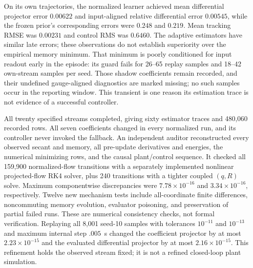 On its own trajectories, the normalized learner achieved mean differential
projector error $0.00622$ and input-aligned relative differential error
$0.00545$, while the frozen prior's corresponding errors were $0.248$ and
$0.219$. Mean tracking RMSE was $0.00231$ and control RMS was $0.6460$.
The adaptive estimators have similar late errors; these observations do not
establish superiority over the empirical memory minimum. That minimum is
poorly conditioned for input readout early in the episode: its guard fails
for 26--65 replay samples and 18--42 own-stream samples per seed. Those
shadow coefficients remain recorded, and their undefined gauge-aligned
diagnostics are marked missing; no such samples occur in the reporting
window. This transient is one reason its estimation trace is not evidence
of a successful controller.

All twenty specified streams completed, giving sixty estimator traces and
480,060 recorded rows. All seven coefficients changed in every normalized
run, and its controller never invoked the fallback. An independent auditor
reconstructed every observed secant and memory, all pre-update derivatives
and energies, the numerical minimizing rows, and the causal plant/control
sequence. It checked all 159,900 normalized-flow transitions with a separately
implemented nonlinear projected-flow RK4 solver, plus 240 transitions with
a tighter coupled $(q,R)$ solve. Maximum componentwise discrepancies were
$7.78\times10^{-16}$ and $3.34\times10^{-16}$, respectively. Twelve new
mechanism tests include all-coordinate finite differences, noncommuting
memory evolution, evaluator poisoning, and preservation of partial failed
runs. These are numerical consistency checks, not formal verification.
Replaying all 8,001 seed-10 samples with tolerances $10^{-11}$ and
$10^{-13}$ and maximum internal step $.005$~s changed the coefficient
projector by at most $2.23\times10^{-15}$ and the evaluated differential
projector by at most $2.16\times10^{-15}$. This refinement holds the
observed stream fixed; it is not a refined closed-loop plant simulation.

